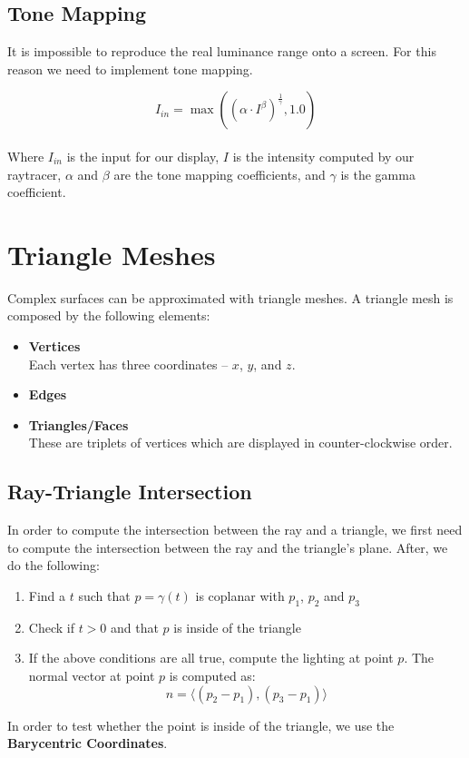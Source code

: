 \documentclass{article}
\begin{document}
\subsection{Tone Mapping}
It is impossible to reproduce the real luminance range onto a screen. For this reason we need to implement tone mapping.

\[ I_{in} = \max((\alpha \cdot I^\beta)^{\frac{1}{\gamma}}, 1.0) \] \\
Where $I_{in}$ is the input for our display, $I$ is the intensity computed by our raytracer, $\alpha$ and $\beta$ are the tone mapping coefficients, and $\gamma$ is the gamma coefficient.

\section{Triangle Meshes}
Complex surfaces can be approximated with triangle meshes. A triangle mesh is composed by the following elements:

\begin{itemize}
	\item \textbf{Vertices}
	\vspace{.2cm} \\
	Each vertex has three coordinates -- $x$, $y$, and $z$.
	
	\item \textbf{Edges}
	\item \textbf{Triangles/Faces}
	\vspace{.2cm} \\
	These are triplets of vertices which are displayed in counter-clockwise order.
\end{itemize}

\subsection{Ray-Triangle Intersection}
In order to compute the intersection between the ray and a triangle, we first need to compute the intersection between the ray and the triangle's plane. After, we do the following:

\begin{enumerate}
	\item Find a $t$ such that $p = \gamma(t)$ is coplanar with $p_1$, $p_2$ and $p_3$
	\item Check if $t > 0$ and that $p$ is inside of the triangle
	\item If the above conditions are all true, compute the lighting at point $p$. The normal vector at point $p$ is computed as:
	\[ n = \langle (p_2 - p_1), (p_3 - p_1) \rangle \]
\end{enumerate}
In order to test whether the point is inside of the triangle, we use the \textbf{Barycentric Coordinates}.
\end{document}
